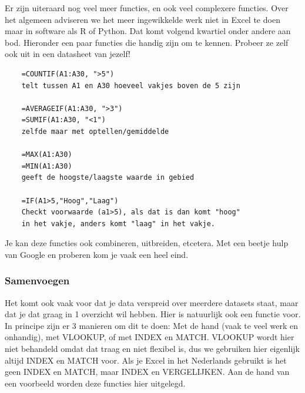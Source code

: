 Er zijn uiteraard nog veel meer functies, en ook veel complexere functies. Over het algemeen adviseren we het meer ingewikkelde werk niet in Excel te doen maar in software als R of Python. Dat komt volgend kwartiel onder andere aan bod. Hieronder een paar functies die handig zijn om te kennen. Probeer ze zelf ook uit in een datasheet van jezelf!

\begin{verbatim}
    =COUNTIF(A1:A30, ">5")
    telt tussen A1 en A30 hoeveel vakjes boven de 5 zijn
    
    =AVERAGEIF(A1:A30, ">3")
    =SUMIF(A1:A30, "<1")
    zelfde maar met optellen/gemiddelde
    
    =MAX(A1:A30)
    =MIN(A1:A30)
    geeft de hoogste/laagste waarde in gebied
    
    =IF(A1>5,"Hoog","Laag")
    Checkt voorwaarde (a1>5), als dat is dan komt "hoog"
    in het vakje, anders komt "laag" in het vakje.
\end{verbatim}

Je kan deze functies ook combineren, uitbreiden, etcetera. Met een beetje hulp van Google en proberen kom je vaak een heel eind. 

\subsubsection*{Samenvoegen}
Het komt ook vaak voor dat je data verspreid over meerdere datasets staat, maar dat je dat graag in 1 overzicht wil hebben. Hier is natuurlijk ook een functie voor. In principe zijn er 3 manieren om dit te doen: Met de hand (vaak te veel werk en onhandig), met VLOOKUP, of met INDEX en MATCH. VLOOKUP wordt hier niet behandeld omdat dat traag en niet flexibel is, dus we gebruiken hier eigenlijk altijd INDEX en MATCH voor. Als je Excel in het Nederlands gebruikt is het geen INDEX en MATCH, maar INDEX en VERGELIJKEN. Aan de hand van een voorbeeld worden deze functies hier uitgelegd.


